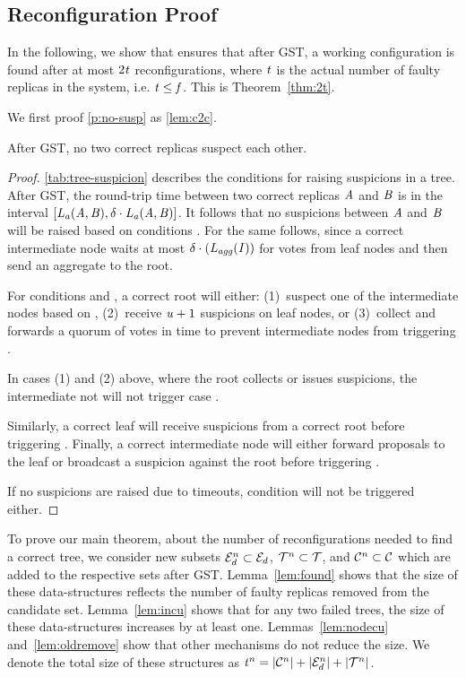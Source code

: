 \subsection{Reconfiguration Proof}
\label{sec:proof}

In the following, we show that \optitree ensures that after GST, a working configuration is found after at most $2\tn$ reconfigurations, where $\tn$ is the actual number of faulty replicas in the system, i.e. $\tn \leq \f$.
This is Theorem~\ref{thm:2t}.

We first proof \ref{p:no-susp} as \cref{lem:c2c}.


\begin{lemma}
  \label{lem:c2c}
  After GST, no two correct replicas suspect each other.
\end{lemma}
\begin{proof}
  \cref{tab:tree-suspicion} describes the conditions for raising suspicions in a tree.
  After GST, the round-trip time between two correct replicas $\na$ and $\nb$ is in the interval $[\lat[a]{\na}{\nb}, \delta\cdot\lat[a]{\na}{\nb}]$.
  It follows that no suspicions between $\na$ and $\nb$ will be raised based on conditions . 
  For  the same follows, since a correct intermediate node waits at most $\df{(\agt{\nin})}$ for votes from leaf nodes and then send an aggregate to the root.

  For conditions  and , a correct root will either:
  (1)~suspect one of the intermediate nodes based on ,
  (2)~receive $\un+1$ suspicions on leaf nodes, or
  (3)~collect and forwards a quorum of votes in time to prevent intermediate nodes from triggering .
  
  In cases (1) and (2) above, where the root collects or issues suspicions, the intermediate not will not trigger case .

  Similarly, a correct leaf will receive suspicions from a correct root before triggering .
  Finally, a correct intermediate node will either forward proposals to the leaf or broadcast a suspicion against the root before triggering .

  If no suspicions are raised due to timeouts, condition  will not be triggered either.
\end{proof}

To prove our main theorem, about the number of reconfigurations needed to find a correct tree,
we consider new subsets $\MG^n\subset\MG$, $\T^n\subset\T$, and $\Crash^n\subset\Crash$ which are added to the respective sets after GST.
Lemma~\ref{lem:found} shows that the size of these data-structures reflects the number of faulty replicas removed from the candidate set.
Lemma~\ref{lem:incu} shows that for any two failed trees, the size of these data-structures increases by at least one.
Lemmas~\ref{lem:nodecu} and~\ref{lem:oldremove} show that other mechanisms do not reduce the size.
We denote the total size of these structures as $\tn^n=|\Crash^n|+|\MG^n|+|\T^n|$.

